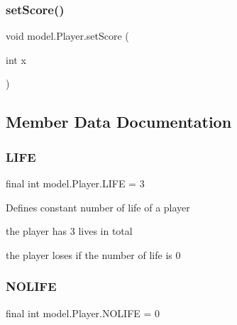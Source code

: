 \subsubsection{\texorpdfstring{set\+Score()}{setScore()}}
{\footnotesize\ttfamily void model.\+Player.\+set\+Score (\begin{DoxyParamCaption}\item[{int}]{x }\end{DoxyParamCaption})}



\subsection{Member Data Documentation}
\hypertarget{classmodel_1_1_player_a59153913ee338710aa1a33b68e5d0dbd}{}\label{classmodel_1_1_player_a59153913ee338710aa1a33b68e5d0dbd} 
\subsubsection{\texorpdfstring{L\+I\+FE}{LIFE}}
{\footnotesize\ttfamily final int model.\+Player.\+L\+I\+FE = 3\hspace{0.3cm}{\ttfamily [private]}}

Defines constant number of life of a player
\begin{DoxyItemize}
\item the player has 3 lives in total
\item the player loses if the number of life is 0 
\end{DoxyItemize}\hypertarget{classmodel_1_1_player_ad422bd3896f6c86c74fe49be0cae6759}{}\label{classmodel_1_1_player_ad422bd3896f6c86c74fe49be0cae6759} 
\subsubsection{\texorpdfstring{N\+O\+L\+I\+FE}{NOLIFE}}
{\footnotesize\ttfamily final int model.\+Player.\+N\+O\+L\+I\+FE = 0\hspace{0.3cm}{\ttfamily [private]}}

\hypertarget{classmodel_1_1_player_ad6d852aea99befddd30bb094222123d2}{}\label{classmodel_1_1_player_ad6d852aea99befddd30bb094222123d2} 
